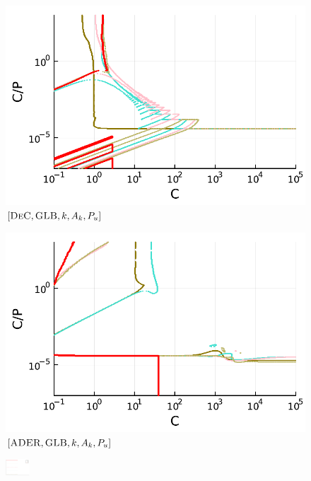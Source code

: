\begin{figure}
	\centering
	\begin{minipage}[t]{0.44\textwidth}
		\centering
		\includegraphics[width=\textwidth]{pdf/pdepics/disp/IMEXDeC_gaussLobatto_disp_advTMM_2-6_newE.pdf}
		\small$[\textsc{DeC}, \textsc{GLB},k,A_k,P_u]$\par
	\end{minipage}\hfill
	\begin{minipage}[t]{0.44\textwidth}
		\centering
		\includegraphics[width=\textwidth]{pdf/pdepics/disp/IMEXADER_gaussLobatto_disp_advTMM_2-6_newE.pdf}
		\small$[\textsc{ADER}, \textsc{GLB},k,A_k,P_u]$\par
	\end{minipage}
	\includegraphics[width=0.08\textwidth, trim={491 180 30 23}, clip]{pdf/pdepics/legends/colors_a-d_new_2-6_no_order.pdf}

\end{figure}
